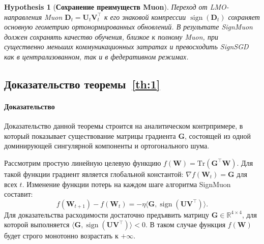 \documentclass{article}
\newtheorem{hypothesis}{Hypothesis}
\begin{document}
\begin{hypothesis}[\textbf{Сохранение преимуществ Muon}]\label{hyp:2}
Переход от LMO-направления Muon $\mathbf{D}_t=\mathbf{U}_t\mathbf{V}_t^\top$ к его знаковой компрессии $\operatorname{sign}(\mathbf{D}_t)$ сохраняет основную геометрию ортонормированных обновлений. В результате SignMuon должен сохранять качество обучения, близкое к полному Muon, при существенно меньших коммуникационных затратах и превосходить SignSGD как в централизованном, так и в федеративном режимах. 
\end{hypothesis}


\subsection{Доказательство теоремы~\ref{th:1}}\label{app:proof_th1}

\paragraph{Доказательство} Доказательство данной теоремы строится на аналитическом контрпримере, в который показывает существование матрицы градиента $\mathbf{G}$, состоящей из одной доминирующей сингулярной компоненты и ортогонального шума.

Рассмотрим простую линейную целевую функцию $f(\mathbf{W}) = \mathrm{Tr}(\mathbf{G}^\top \mathbf{W})$. Для такой функции градиент является глобальной константой: $\nabla f(\mathbf{W}_t) = \mathbf{G}$ для всех $t$. Изменение функции потерь на каждом шаге алгоритма SignMuon составит:
\begin{equation}
f(\mathbf{W}_{t+1}) - f(\mathbf{W}_t) = -\eta \langle \mathbf{G}, \operatorname{sign}(\mathbf{U} \mathbf{V}^\top) \rangle.
\end{equation} 
Для доказательства расходимости достаточно предъявить матрицу $\mathbf{G} \in \mathbb{R}^{4 \times 4}$, для которой выполняется $\langle \mathbf{G}, \operatorname{sign}(\mathbf{U} \mathbf{V}^\top) \rangle < 0$. В таком случае функция $f(\mathbf{W})$ будет строго монотонно возрастать к $+\infty$.
\end{document}

